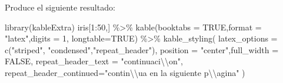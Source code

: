 \documentclass[12pt,a4paper,oneside,]{article}
\newenvironment{Shaded}{\begin{snugshade}}{\end{snugshade}}
\newcommand{\AttributeTok}[1]{\textcolor[rgb]{0.77,0.63,0.00}{#1}}
\newcommand{\ConstantTok}[1]{\textcolor[rgb]{0.00,0.00,0.00}{#1}}
\newcommand{\DecValTok}[1]{\textcolor[rgb]{0.00,0.00,0.81}{#1}}
\newcommand{\FunctionTok}[1]{\textcolor[rgb]{0.00,0.00,0.00}{#1}}
\newcommand{\NormalTok}[1]{#1}
\newcommand{\SpecialCharTok}[1]{\textcolor[rgb]{0.00,0.00,0.00}{#1}}
\newcommand{\StringTok}[1]{\textcolor[rgb]{0.31,0.60,0.02}{#1}}
\numberwithin{dummy}{section}
\theoremstyle{ocrenumbox}
\theoremstyle{blacknumex}
\theoremstyle{blacknumbox}
\theoremstyle{ocrenum}
\theoremstyle{ocrenum}
\begin{document}
Produce el siguiente resultado:

\begin{Shaded}
\begin{Highlighting}[]
\FunctionTok{library}\NormalTok{(kableExtra) }
\NormalTok{iris[}\DecValTok{1}\SpecialCharTok{:}\DecValTok{50}\NormalTok{,] }\SpecialCharTok{\%\textgreater{}\%} 
  \FunctionTok{kable}\NormalTok{(}\AttributeTok{booktabs =} \ConstantTok{TRUE}\NormalTok{,}\AttributeTok{format =} \StringTok{"latex"}\NormalTok{,}\AttributeTok{digits =} \DecValTok{1}\NormalTok{, }\AttributeTok{longtable=}\ConstantTok{TRUE}\NormalTok{) }\SpecialCharTok{\%\textgreater{}\%}
  \FunctionTok{kable\_styling}\NormalTok{(}
   \AttributeTok{latex\_options =} \FunctionTok{c}\NormalTok{(}\StringTok{"striped"}\NormalTok{, }\StringTok{"condensed"}\NormalTok{,}\StringTok{"repeat\_header"}\NormalTok{), }
   \AttributeTok{position =} \StringTok{"center"}\NormalTok{,}\AttributeTok{full\_width =} \ConstantTok{FALSE}\NormalTok{,}
   \AttributeTok{repeat\_header\_text =} \StringTok{"continuaci}\SpecialCharTok{\textbackslash{}\textbackslash{}}\StringTok{\textquotesingle{}on"}\NormalTok{, }
   \AttributeTok{repeat\_header\_continued=}\StringTok{"contin}\SpecialCharTok{\textbackslash{}\textbackslash{}}\StringTok{\textquotesingle{}ua en la siguiente p}\SpecialCharTok{\textbackslash{}\textbackslash{}}\StringTok{\textquotesingle{}agina"}
\NormalTok{  )}
\end{Highlighting}
\end{Shaded}
\end{document}
